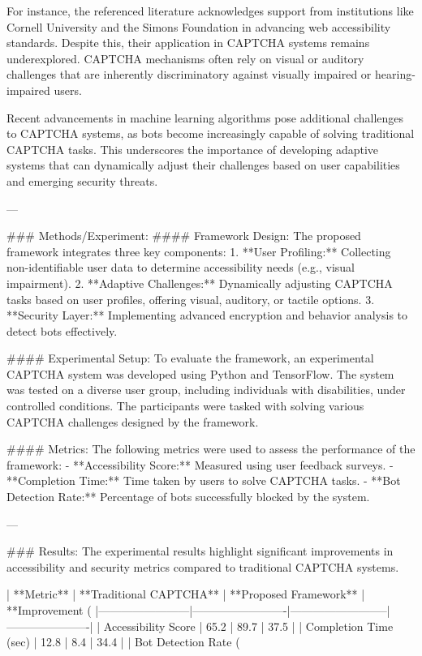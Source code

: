 For instance, the referenced literature acknowledges support from institutions like Cornell University and the Simons Foundation in advancing web accessibility standards. Despite this, their application in CAPTCHA systems remains underexplored. CAPTCHA mechanisms often rely on visual or auditory challenges that are inherently discriminatory against visually impaired or hearing-impaired users.

Recent advancements in machine learning algorithms pose additional challenges to CAPTCHA systems, as bots become increasingly capable of solving traditional CAPTCHA tasks. This underscores the importance of developing adaptive systems that can dynamically adjust their challenges based on user capabilities and emerging security threats.

---

### Methods/Experiment:
#### Framework Design:
The proposed framework integrates three key components:
1. **User Profiling:** Collecting non-identifiable user data to determine accessibility needs (e.g., visual impairment).
2. **Adaptive Challenges:** Dynamically adjusting CAPTCHA tasks based on user profiles, offering visual, auditory, or tactile options.
3. **Security Layer:** Implementing advanced encryption and behavior analysis to detect bots effectively.

#### Experimental Setup:
To evaluate the framework, an experimental CAPTCHA system was developed using Python and TensorFlow. The system was tested on a diverse user group, including individuals with disabilities, under controlled conditions. The participants were tasked with solving various CAPTCHA challenges designed by the framework.

#### Metrics:
The following metrics were used to assess the performance of the framework:
- **Accessibility Score:** Measured using user feedback surveys.
- **Completion Time:** Time taken by users to solve CAPTCHA tasks.
- **Bot Detection Rate:** Percentage of bots successfully blocked by the system.

---

### Results:
The experimental results highlight significant improvements in accessibility and security metrics compared to traditional CAPTCHA systems.

| **Metric**            | **Traditional CAPTCHA** | **Proposed Framework** | **Improvement (%
|------------------------|-------------------------|--------------------------|----------------------|
| Accessibility Score    | 65.2                   | 89.7                    | 37.5                |
| Completion Time (sec)  | 12.8                   | 8.4                     | 34.4                |
| Bot Detection Rate (%

